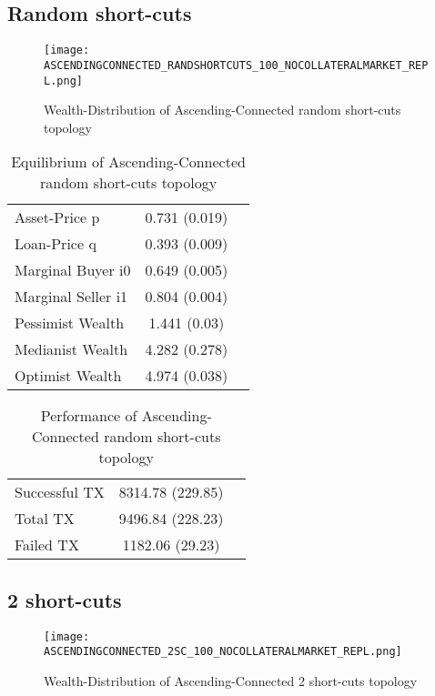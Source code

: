\documentclass[Bachelorarbeit.tex]{subfiles}
\begin{document}
\subsection{Random short-cuts}
\begin{figure}[H]
	\centering
  \texttt{[image: ASCENDINGCONNECTED\_RANDSHORTCUTS\_100\_NOCOLLATERALMARKET\_REPL.png]}
	\caption{Wealth-Distribution of Ascending-Connected random short-cuts topology}
	\label{fig:wealth_ASCENDINGCONNECTED_RANDSHORTCUTS_100_NOCOLLATERALMARKET_REPL}
\end{figure}

\begin{table}[H]
	\caption{Equilibrium of Ascending-Connected random short-cuts topology}
	\centering
	\begin{tabular} { l c r }
		\hline
		Asset-Price p & 0.731 (0.019) \\
		Loan-Price q & 0.393 (0.009) \\
		Marginal Buyer i0 & 0.649 (0.005) \\
		Marginal Seller i1 & 0.804 (0.004) \\
		\hline
		Pessimist Wealth & 1.441 (0.03) \\
		Medianist Wealth & 4.282 (0.278) \\
		Optimist Wealth & 4.974 (0.038) \\
		\hline
	\end{tabular}
\end{table} 

\begin{table}[H]
	\caption{Performance of Ascending-Connected random short-cuts topology}
	\centering
	\begin{tabular} { l c r }
		\hline
		Successful TX & 8314.78 (229.85) \\
		Total TX & 9496.84 (228.23) \\
		Failed TX & 1182.06 (29.23) \\
		\hline
	\end{tabular}
\end{table}

\subsection{2 short-cuts}
\begin{figure}[H]
	\centering
  \texttt{[image: ASCENDINGCONNECTED\_2SC\_100\_NOCOLLATERALMARKET\_REPL.png]}
	\caption{Wealth-Distribution of Ascending-Connected 2 short-cuts topology}
	\label{fig:wealth_ASCENDINGCONNECTED_2SC_100_NOCOLLATERALMARKET_REPL}
\end{figure}
\end{document}

